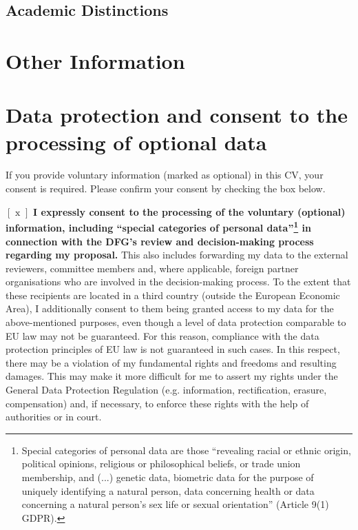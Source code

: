 \documentclass{scrartcl}
\begin{document}
\subsection*{Academic Distinctions}

\section*{Other Information}

\section*{Data protection and consent to the processing of optional data}
If you provide voluntary information (marked as optional) in this CV, your consent is required. Please confirm your consent by checking the box below. 

$[\text{ x }]$ \textbf{I expressly consent to the processing of the voluntary (optional) information, including  ``special categories of personal data''\footnote{Special categories of personal data are those ``revealing racial or ethnic origin, political opinions, religious or philosophical beliefs, or trade union membership, and (...) genetic data, biometric data for the purpose of uniquely identifying a natural person, data concerning health or data concerning a natural person's sex life or sexual orientation'' (Article 9(1) GDPR).}  in connection with the DFG's review and decision-making process regarding my proposal.} This also includes forwarding my data to the external reviewers, committee members and, where applicable, foreign partner organisations who are involved in the decision-making process. To the extent that these recipients are located in a third country (outside the European Economic Area), I additionally consent to them being granted access to my data for the above-mentioned purposes, even though a level of data protection comparable to EU law may not be guaranteed. For this reason, compliance with the data protection principles of EU law is not guaranteed in such cases. In this respect, there may be a violation of my fundamental rights and freedoms and resulting damages. This may make it more difficult for me to assert my rights under the General Data Protection Regulation (e.g. information, rectification, erasure, compensation) and, if necessary, to enforce these rights with the help of authorities or in court.
\end{document}
